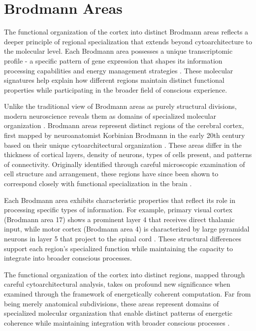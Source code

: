 \section{Brodmann Areas}

The functional organization of the cortex into distinct Brodmann areas reflects a deeper principle of regional specialization that extends beyond cytoarchitecture to the molecular level. Each Brodmann area possesses a unique transcriptomic profile - a specific pattern of gene expression that shapes its information processing capabilities and energy management strategies \cite{Amunts2015}. These molecular signatures help explain how different regions maintain distinct functional properties while participating in the broader field of conscious experience.

Unlike the traditional view of Brodmann areas as purely structural divisions, modern neuroscience reveals them as domains of specialized molecular organization \cite{Amunts2007}. Brodmann areas represent distinct regions of the cerebral cortex, first mapped by neuroanatomist Korbinian Brodmann in the early 20th century based on their unique cytoarchitectural organization \cite{Brodmann1909}. These areas differ in the thickness of cortical layers, density of neurons, types of cells present, and patterns of connectivity. Originally identified through careful microscopic examination of cell structure and arrangement, these regions have since been shown to correspond closely with functional specialization in the brain \cite{Eickhoff2018}.

Each Brodmann area exhibits characteristic properties that reflect its role in processing specific types of information. For example, primary visual cortex (Brodmann area 17) shows a prominent layer 4 that receives direct thalamic input, while motor cortex (Brodmann area 4) is characterized by large pyramidal neurons in layer 5 that project to the spinal cord \cite{Zilles2010}. These structural differences support each region's specialized function while maintaining the capacity to integrate into broader conscious processes.

The functional organization of the cortex into distinct regions, mapped through careful cytoarchitectural analysis, takes on profound new significance when examined through the framework of energetically coherent computation. Far from being merely anatomical subdivisions, these areas represent domains of specialized molecular organization that enable distinct patterns of energetic coherence while maintaining integration with broader conscious processes \cite{Glasser2016}.

